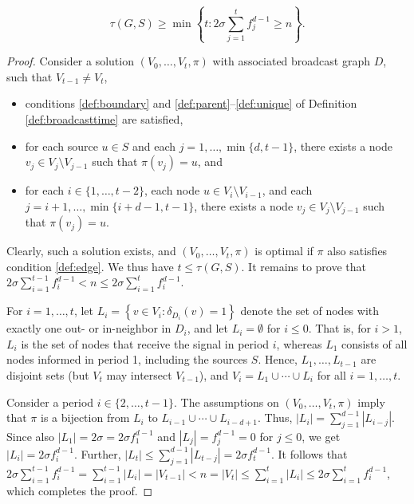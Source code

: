 \begin{proposition}
\begin{equation*}
\label{lem:lbreg1}
	\tau(G,S)\geq\min\left\{t:2\sigma\sum\limits_{j=1}^tf^{d-1}_j\geq n\right\}.
\end{equation*}
\label{prop:lbfib}
\end{proposition}
\begin{proof}

Consider a solution $\left(V_0,\ldots,V_t,\pi\right)$ with associated broadcast graph $D$, such that $V_{t-1}\neq V_t$, 
\begin{itemize}
  \item conditions \ref{def:boundary} and \ref{def:parent}--\ref{def:unique} of Definition \ref{def:broadcasttime} are satisfied,
  \item for each source $u\in S$ and each $j=1,\ldots,\min\{d,t-1\}$, there exists a node $v_j\in V_j\setminus V_{j-1}$ such that $\pi\left(v_j\right)=u$, and
  \item for each $i\in\{1,\ldots,t-2\}$, each node $u\in V_i\setminus V_{i-1}$, and each $j=i+1,\ldots,\min\{i+d-1,t-1\}$,
        there exists a node $v_j\in V_j\setminus V_{j-1}$ such that $\pi\left(v_j\right)=u$.
\end{itemize}
\noindent
Clearly, such a solution exists, and $\left(V_0,\ldots,V_t,\pi\right)$ is optimal if $\pi$ also satisfies condition \ref{def:edge}.
We thus have $t\leq\tau(G,S)$.
It remains to prove that $2\sigma\sum_{i=1}^{t-1}f_i^{d-1}<n\leq 2\sigma\sum_{i=1}^tf_i^{d-1}$.

For $i=1,\ldots,t$, let $L_i=\left\{v\in V_i:\delta_{D_i}(v)=1\right\}$ denote the set of nodes with exactly one out- or in-neighbor in $D_i$,
and let $L_i=\emptyset$ for $i\leq 0$.
That is, for $i>1$, $L_i$ is the set of nodes that receive the signal in period $i$, whereas $L_1$ consists of all nodes informed in period 1, including the sources $S$.
Hence, $L_1,\ldots,L_{t-1}$ are disjoint sets (but $V_t$ may intersect $V_{t-1}$), and $V_i=L_1\cup\cdots\cup L_i$ for all $i=1,\ldots,t$.

Consider a period $i\in\{2,\ldots,t-1\}$.
The assumptions on $\left(V_0,\ldots,V_t,\pi\right)$ imply that $\pi$ is a bijection from $L_i$ to $L_{i-1}\cup\cdots\cup L_{i-d+1}$.
Thus, $\left|L_i\right|=\sum_{j=1}^{d-1}\left|L_{i-j}\right|$.
Since also $\left|L_1\right|=2\sigma=2\sigma f_1^{d-1}$ and $\left|L_j\right|=f_j^{d-1}=0$ for $j\leq 0$,
we get $\left|L_i\right|=2\sigma f_i^{d-1}$.
Further, $\left|L_t\right|\leq\sum_{j=1}^{d-1}\left|L_{t-j}\right|=2\sigma f_t^{d-1}$.
It follows that $2\sigma\sum_{i=1}^{t-1}f_i^{d-1}=\sum_{i=1}^{t-1}\left|L_i\right|=\left|V_{t-1}\right|<n=\left|V_t\right|\leq\sum_{i=1}^t\left|L_i\right|\leq 2\sigma\sum_{i=1}^tf_i^{d-1}$,
which completes the proof.
\end{proof}

